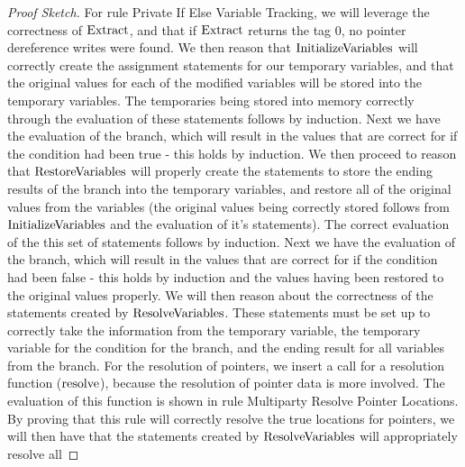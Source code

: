 \begin{proof}[Proof Sketch]
For rule Private If Else Variable Tracking, we will leverage the correctness of $\mathrm{ Extract}$, and that if $\mathrm{ Extract}$ returns the tag 0, no pointer dereference writes were found. We then reason that $\mathrm{InitializeVariables}$ will correctly create the assignment statements for our temporary variables, and that the original values for each of the modified variables will be stored into the  temporary variables. The temporaries being stored into memory correctly through the evaluation of these statements follows by induction. Next we have the evaluation of the  branch, which will result in the values that are correct for if the condition had been true - this holds by induction. 
We then proceed to reason that $\mathrm{RestoreVariables}$ will properly create the statements to store the ending results of the  branch into the  temporary variables, and restore all of the original values from the  variables (the original values being correctly stored follows from $\mathrm{InitializeVariables}$ and the evaluation of it's statements). The correct evaluation of the this set of statements follows by induction. 
Next we have the evaluation of the  branch, which will result in the values that are correct for if the condition had been false - this holds by induction and the values having been restored to the original values properly.
We will then reason about the correctness of the statements created by $\mathrm{ResolveVariables}$. These statements must be set up to correctly take the information from the  temporary variable, the temporary variable for the condition for the branch, and the ending result for all variables from the  branch. For the resolution of pointers, we insert a call for a resolution function ($\mathrm{resolve}$), because the resolution of pointer data is more involved. The evaluation of this function is shown in rule Multiparty Resolve Pointer Locations. By proving that this rule will correctly resolve the true locations for pointers, we will then have that the statements created by $\mathrm{ResolveVariables}$ will appropriately resolve all 



\end{proof}
